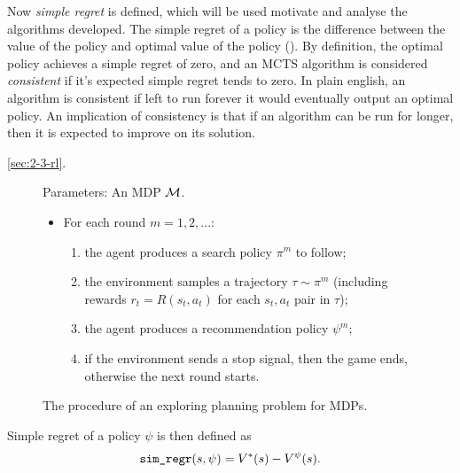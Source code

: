     Now \textit{simple regret} is defined, which will be used motivate and analyse the algorithms developed. The simple regret of a policy is the difference between the value of the policy and optimal value of the policy (). By definition, the optimal policy achieves a simple regret of zero, and an MCTS algorithm is considered \textit{consistent} if it's expected simple regret tends to zero. In plain english, an algorithm is consistent if left to run forever it would eventually output an optimal policy. An implication of consistency is that if an algorithm can be run for longer, then it is expected to improve on its solution.

     \ref{sec:2-3-rl}. 

    \begin{figure}
        \begin{tcolorbox}
            Parameters: An MDP $\mathcal{M}$.
            \begin{itemize}
                \item For each round $m=1,2,...$:
                \begin{enumerate}
                    \item the agent produces a search policy $\pi^m$ to follow;
                    \item the environment samples a trajectory $\tau\sim\pi^m$ (including rewards $r_t=R(s_t,a_t)$ for each $s_t,a_t$ pair in $\tau$);
                    \item the agent produces a recommendation policy $\psi^m$;
                    \item if the environment sends a stop signal, then the game ends, otherwise the next round starts.
                \end{enumerate} 
            \end{itemize}
        \end{tcolorbox}
        \caption{The procedure of an exploring planning problem for MDPs.  }
        \label{fig:3:planning_problem}
    \end{figure}

    Simple regret of a policy $\psi$ is then defined as
    \begin{align}
        {\textnormal{\texttt{sim\_regr}}}(s,\psi) = V^*(s)-V^{\psi}(s).
    \end{align}

